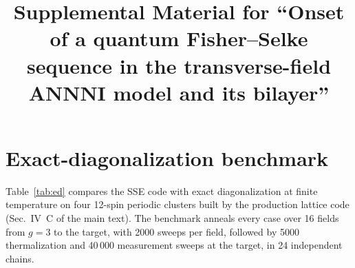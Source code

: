 \documentclass[aps,prb,twocolumn,superscriptaddress,floatfix]{revtex4-2}
\begin{document}
\title{Supplemental Material for ``Onset of a quantum Fisher--Selke sequence in the transverse-field ANNNI model and its
bilayer''}
\maketitle

\section{Exact-diagonalization benchmark}

Table~\ref{tab:ed} compares the SSE code with exact diagonalization at finite temperature on four 12-spin periodic
clusters built by the production lattice code (Sec.~IV~C of the main text). The benchmark anneals every case over 16 fields from $g=3$ to the target,
with 2000 sweeps per field, followed by 5000 thermalization and 40\,000 measurement sweeps at the
target, in 24 independent chains.
\end{document}
